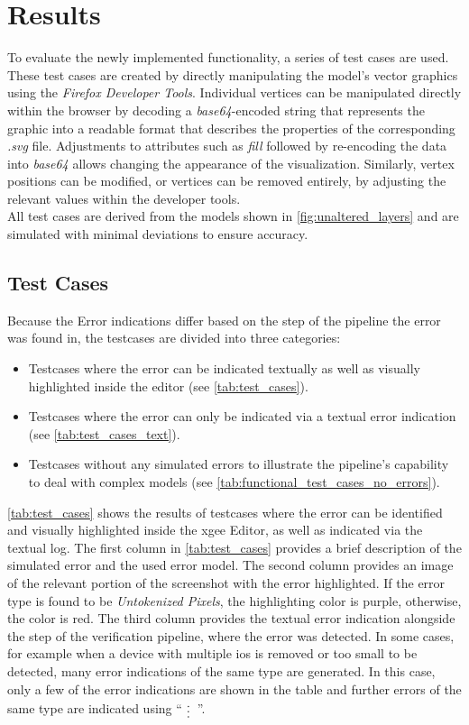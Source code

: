 \chapter{Results}
\label{chap:evaluation}

To evaluate the newly implemented functionality, a series of test cases are used. These test cases are created by directly manipulating the model's vector graphics using the \textit{Firefox Developer Tools}. Individual vertices can be manipulated directly within the browser by decoding a \textit{base64}-encoded string that represents the graphic into a readable format that describes the properties of the corresponding \textit{.svg} file. Adjustments to attributes such as \textit{fill} followed by re-encoding the data into \textit{base64} allows changing the appearance of the visualization. Similarly, vertex positions can be modified, or vertices can be removed entirely, by adjusting the relevant values within the developer tools.\\
All test cases are derived from the models shown in \autoref{fig:unaltered_layers} and are simulated with minimal deviations to ensure accuracy.

\section{Test Cases}
\label{sec:test_cases}
Because the Error indications differ based on the step of the pipeline the error was found in, the testcases are divided into three categories:
\begin{itemize}
    \item Testcases where the error can be indicated textually as well as visually highlighted inside the editor (see \autoref{tab:test_cases}).
    \item Testcases where the error can only be indicated via a textual error indication (see \autoref{tab:test_cases_text}).
    \item Testcases without any simulated errors to illustrate the pipeline's capability to deal with complex models (see \autoref{tab:functional_test_cases_no_errors}).
\end{itemize}
\autoref{tab:test_cases} shows the results of testcases where the error can be identified and visually highlighted inside the \acrshort{xgee} Editor, as well as indicated via the textual log. The first column in \autoref{tab:test_cases} provides a brief description of the simulated error and the used error model. The second column provides an image of the relevant portion of the screenshot with the error highlighted. If the error type is found to be \textit{Untokenized Pixels}, the highlighting color is purple, otherwise, the color is red. The third column provides the textual error indication alongside the step of the verification pipeline, where the error was detected. In some cases, for example when a device with multiple \acrshort{io}s is removed or too small to be detected, many error indications of the same type are generated. In this case, only a few of the error indications are shown in the table and further errors of the same type are indicated using `` $\lowvdots$\ ''.

